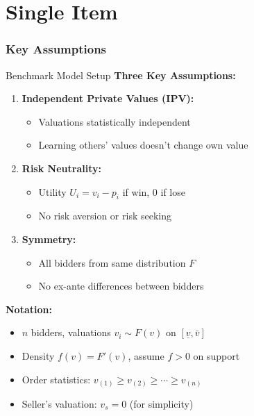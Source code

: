 \documentclass[xcolor={x11names}, aspectratio=169 ]{beamer}
\begin{document}
\part{Single Item}
\section{Key Assumptions}

\begin{frame}{Benchmark Model Setup}
\textbf{Three Key Assumptions:}
\begin{enumerate}
  \item \textbf{Independent Private Values (IPV):} 
  \begin{itemize}
    \item Valuations statistically independent
    \item Learning others' values doesn't change own value
  \end{itemize}
  \item \textbf{Risk Neutrality:} 
  \begin{itemize}
    \item Utility $U_i = v_i - p_i$ if win, 0 if lose
    \item No risk aversion or risk seeking
  \end{itemize}
  \item \textbf{Symmetry:} 
  \begin{itemize}
    \item All bidders from same distribution $F$
    \item No ex-ante differences between bidders
  \end{itemize}
\end{enumerate}

\textbf{Notation:}
\begin{itemize}
  \item $n$ bidders, valuations $v_i \sim F(v)$ on $[\underline{v}, \bar{v}]$
  \item Density $f(v) = F'(v)$, assume $f > 0$ on support
  \item Order statistics: $v_{(1)} \geq v_{(2)} \geq \cdots \geq v_{(n)}$
  \item Seller's valuation: $v_s = 0$ (for simplicity)
\end{itemize}
\end{frame}
\end{document}
